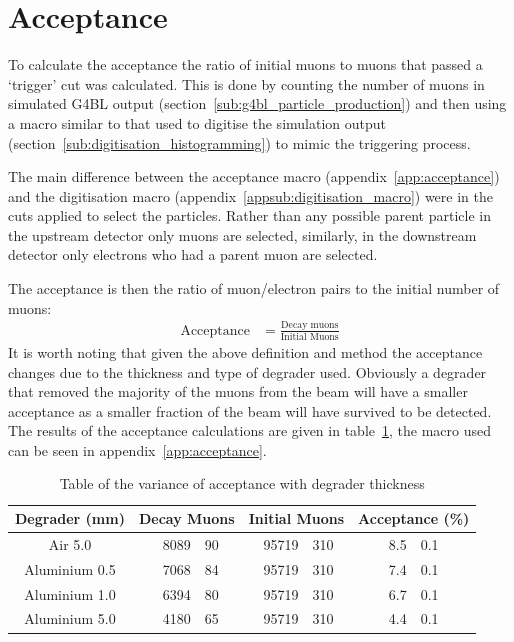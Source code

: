 \documentclass[]{article}
\begin{document}
\section{Acceptance} %
\label{sec:acceptance}
To calculate the acceptance the ratio of initial muons to muons that passed a `trigger' cut was calculated. This is done by counting the number of muons in simulated G4BL output (section~\ref{sub:g4bl_particle_production}) and then using a macro similar to that used to digitise the simulation output (section~\ref{sub:digitisation_histogramming}) to mimic the triggering process.

The main difference between the acceptance macro (appendix~\ref{app:acceptance}) and the digitisation macro (appendix~\ref{appsub:digitisation_macro}) were in the cuts applied to select the particles. Rather than any possible parent particle in the upstream detector only muons are selected, similarly, in the downstream detector only electrons who had a parent muon are selected.

The acceptance is then the ratio of muon/electron pairs to the initial number of muons:
\begin{align}
    \text{Acceptance} &= \frac{\text{Decay muons}}{\text{Initial Muons}} \label{equ:acceptance}
\end{align}
It is worth noting that given the above definition and method the acceptance changes due to the thickness and type of degrader used. Obviously a degrader that removed the majority of the muons from the beam will have a smaller acceptance as a smaller fraction of the beam will have survived to be detected. The results of the acceptance calculations are given in table~\ref{tab:acceptance}, the macro used can be seen in appendix~\ref{app:acceptance}.
\begin{table}
    \begin{center}
    \begin{tabular}{c| r@{ $\pm$ }l | r@{ $\pm$ }l | r@{ $\pm$ }l }
        Degrader (mm) & \multicolumn{2}{|c}{Decay Muons} & \multicolumn{2}{|c}{Initial Muons} & \multicolumn{2}{|c}{Acceptance (\%)}\\
        \hline
        Air 5.0       & 8089 & 90 & 95719 & 310 & 8.5 & 0.1 \\
        Aluminium 0.5 & 7068 & 84 & 95719 & 310 & 7.4 & 0.1 \\
        Aluminium 1.0 & 6394 & 80 & 95719 & 310 & 6.7 & 0.1 \\
        Aluminium 5.0 & 4180 & 65 & 95719 & 310 & 4.4 & 0.1 \\
    \end{tabular}
    \end{center}
    \caption{Table of the variance of acceptance with degrader thickness}
    \label{tab:acceptance}
\end{table}
\end{document}
